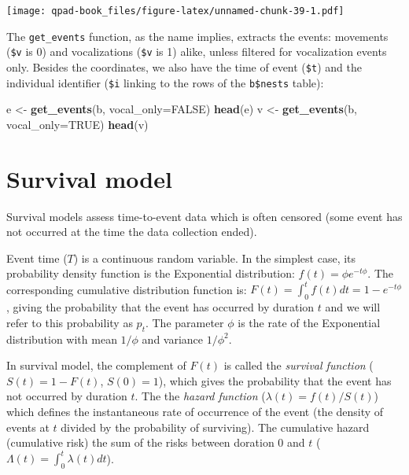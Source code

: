 \documentclass[12pt,]{book}
\newenvironment{Shaded}{\begin{snugshade}}{\end{snugshade}}
\newcommand{\DataTypeTok}[1]{\textcolor[rgb]{0.13,0.29,0.53}{#1}}
\newcommand{\KeywordTok}[1]{\textcolor[rgb]{0.13,0.29,0.53}{\textbf{#1}}}
\newcommand{\NormalTok}[1]{#1}
\newcommand{\OtherTok}[1]{\textcolor[rgb]{0.56,0.35,0.01}{#1}}
\newcommand{\StringTok}[1]{\textcolor[rgb]{0.31,0.60,0.02}{#1}}
\begin{document}
\texttt{[image: qpad-book\_files/figure-latex/unnamed-chunk-39-1.pdf]}

The \texttt{get\_events} function, as the name implies, extracts the events:
movements (\texttt{\$v} is 0) and vocalizations (\texttt{\$v} is 1) alike,
unless filtered for vocalization events only.
Besides the coordinates, we also have the time of event (\texttt{\$t}) and
the individual identifier (\texttt{\$i} linking to the rows of the \texttt{b\$nests} table):

\begin{Shaded}
\begin{Highlighting}[]
\NormalTok{e <-}\StringTok{ }\KeywordTok{get_events}\NormalTok{(b, }\DataTypeTok{vocal_only=}\OtherTok{FALSE}\NormalTok{)}
\KeywordTok{head}\NormalTok{(e)}
\NormalTok{v <-}\StringTok{ }\KeywordTok{get_events}\NormalTok{(b, }\DataTypeTok{vocal_only=}\OtherTok{TRUE}\NormalTok{)}
\KeywordTok{head}\NormalTok{(v)}
\end{Highlighting}
\end{Shaded}

\hypertarget{survival-model}{%
\section{Survival model}\label{survival-model}}

Survival models assess time-to-event data which is often censored
(some event has not occurred at the time the data collection ended).

Event time (\(T\)) is a continuous random variable.
In the simplest case, its probability density function is the Exponential
distribution: \(f(t)=\phi e^{-t\phi}\).
The corresponding cumulative distribution function is:
\(F(t)=\int_{0}^{t} f(t)dt=1-e^{-t\phi}\),
giving the probability that the event has occurred by duration \(t\) and we will refer to
this probability as \(p_t\). The parameter \(\phi\) is the rate of the Exponential distribution
with mean \(1/\phi\) and variance \(1/\phi^2\).

In survival model, the complement of \(F(t)\) is called the
\emph{survival function} (\(S(t)=1-F(t)\), \(S(0)=1\)),
which gives the probability that the event has not occurred by duration \(t\).
The the \emph{hazard function} (\(\lambda(t)=f(t)/S(t)\))
which defines the instantaneous rate of occurrence of the event
(the density of events at \(t\) divided by the probability of surviving).
The cumulative hazard (cumulative risk) the sum of the risks between doration 0 and \(t\)
(\(\Lambda(t)=\int_{0}^{t} \lambda(t)dt\)).
\end{document}
